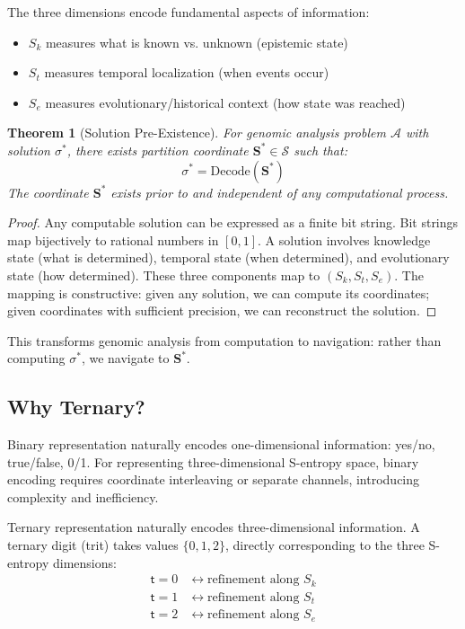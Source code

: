 \documentclass[twocolumn,10pt]{article}
\newtheorem{theorem}{Theorem}[section]
\theoremstyle{remark}
\newcommand{\Sk}{S_k}
\newcommand{\St}{S_t}
\newcommand{\Se}{S_e}
\newcommand{\Sspace}{\mathcal{S}}
\newcommand{\Scoord}{\mathbf{S}}
\newcommand{\tmark}{\mathsf{t}}
\begin{document}
The three dimensions encode fundamental aspects of information:
\begin{itemize}
\item $\Sk$ measures what is known vs. unknown (epistemic state)
\item $\St$ measures temporal localization (when events occur)
\item $\Se$ measures evolutionary/historical context (how state was reached)
\end{itemize}

\begin{theorem}[Solution Pre-Existence]
\label{thm:preexistence}
For genomic analysis problem $\mathcal{A}$ with solution $\sigma^*$, there exists partition coordinate $\Scoord^* \in \Sspace$ such that:
\begin{equation}
\sigma^* = \text{Decode}(\Scoord^*)
\end{equation}
The coordinate $\Scoord^*$ exists prior to and independent of any computational process.
\end{theorem}

\begin{proof}
Any computable solution can be expressed as a finite bit string. Bit strings map bijectively to rational numbers in $[0,1]$. A solution involves knowledge state (what is determined), temporal state (when determined), and evolutionary state (how determined). These three components map to $(\Sk, \St, \Se)$. The mapping is constructive: given any solution, we can compute its coordinates; given coordinates with sufficient precision, we can reconstruct the solution.
\end{proof}

This transforms genomic analysis from computation to navigation: rather than computing $\sigma^*$, we navigate to $\Scoord^*$.

\subsection{Why Ternary?}

Binary representation naturally encodes one-dimensional information: yes/no, true/false, 0/1. For representing three-dimensional S-entropy space, binary encoding requires coordinate interleaving or separate channels, introducing complexity and inefficiency.

Ternary representation naturally encodes three-dimensional information. A ternary digit (trit) takes values $\{0, 1, 2\}$, directly corresponding to the three S-entropy dimensions:
\begin{align}
\tmark = 0 &\leftrightarrow \text{refinement along } \Sk \\
\tmark = 1 &\leftrightarrow \text{refinement along } \St \\
\tmark = 2 &\leftrightarrow \text{refinement along } \Se
\end{align}
\end{document}
